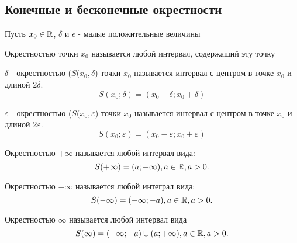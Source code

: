\subsection{Конечные и бесконечные окрестности}

Пусть $x_0\in \mathbb{R}$, $\delta$ и $\epsilon$ - малые положительные величины

\begin{definition}
  Окрестностью точки $x_0$ называется любой интервал, содержаший эту точку
\end{definition}

\begin{definition}
  $\delta$ - окрестностью ($S(x_0, \delta$) точки $x_0$ называется интервал с центром в точке $x_0$ и длиной 2$\delta$.
  \[
  S(x_0; \delta) = (x_0 - \delta; x_0 + \delta)
  \] 
\end{definition}

\begin{definition}
  $\varepsilon$ - окрестностью ($S(x_0, \varepsilon$) точки $x_0$ называется интервал с центром в точке $x_0$ и длиной 2$\varepsilon$.
  \[
  S(x_0; \varepsilon) = (x_0 - \varepsilon; x_0 + \varepsilon)
  \] 
\end{definition}

\begin{definition}
  Окрестностью $+\infty$ называется любой интервал вида:
  \[
  S(+\infty) = (a; +\infty), a\in \mathbb{R}, a > 0
  .\] 
\end{definition}

\begin{definition}
  Окрестностью $-\infty$ называется любой интеграл вида:
  \[
  S(-\infty) = (-\infty; -a), a\in \mathbb{R}, a > 0
  .\] 
\end{definition}

\begin{definition}
  Окрестностью $\infty$ называется любой интервал вида
  \[
  S(\infty) = (-\infty; -a) \cup (a; +\infty), a\in \mathbb{R}, a > 0
  .\] 
\end{definition}

